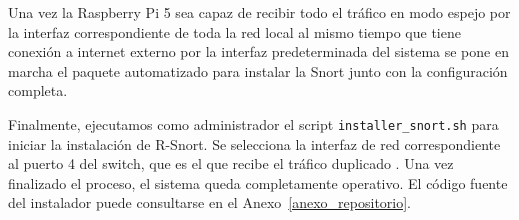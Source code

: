 \documentclass[11pt,a4paper,twoside]{report}
\begin{document}
Una vez la Raspberry Pi 5 sea capaz de recibir todo el tráfico en modo espejo por la interfaz correspondiente de toda la red local al mismo tiempo que tiene conexión a internet externo por la interfaz predeterminada del sistema se pone en marcha el paquete automatizado para instalar la Snort junto con la configuración completa.

\pagebreak

Finalmente, ejecutamos como administrador el script \texttt{installer\_snort.sh} para iniciar la instalación de R-Snort. Se selecciona la interfaz de red correspondiente al puerto 4 del switch, que es el que recibe el tráfico duplicado \cite{bartman2016snort}. Una vez finalizado el proceso, el sistema queda completamente operativo. El código fuente del instalador puede consultarse en el Anexo~\ref{anexo_repositorio}.
\end{document}
